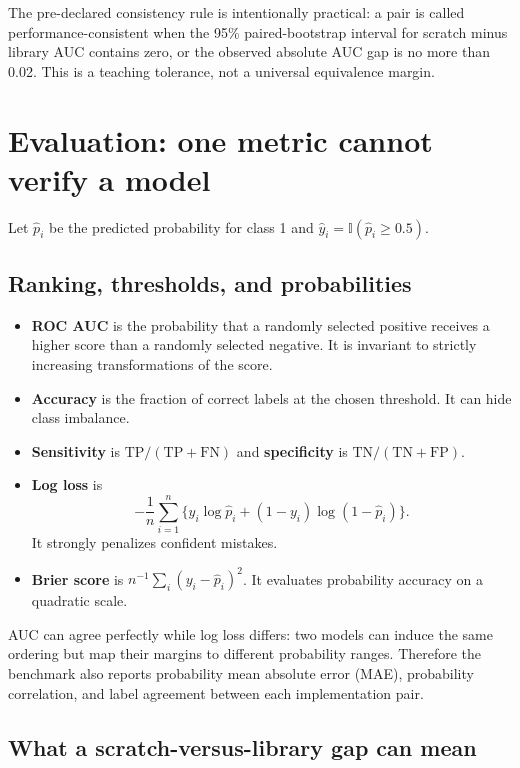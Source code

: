 \documentclass[11pt]{article}
\newcommand{\ind}{\mathbb{1}}
\renewcommand{\ind}{\mathbb{I}}
\begin{document}
The pre-declared consistency rule is intentionally practical: a pair is called
performance-consistent when the 95\% paired-bootstrap interval for scratch minus
library AUC contains zero, or the observed absolute AUC gap is no more than 0.02.
This is a teaching tolerance, not a universal equivalence margin.

\section{Evaluation: one metric cannot verify a model}

Let $\hat p_i$ be the predicted probability for class 1 and
$\hat y_i=\ind(\hat p_i\geq 0.5)$.

\subsection{Ranking, thresholds, and probabilities}

\begin{itemize}
\item \textbf{ROC AUC} is the probability that a randomly selected positive
receives a higher score than a randomly selected negative. It is invariant to
strictly increasing transformations of the score.
\item \textbf{Accuracy} is the fraction of correct labels at the chosen
threshold. It can hide class imbalance.
\item \textbf{Sensitivity} is $\mathrm{TP}/(\mathrm{TP}+\mathrm{FN})$ and
\textbf{specificity} is $\mathrm{TN}/(\mathrm{TN}+\mathrm{FP})$.
\item \textbf{Log loss} is
\[
 -\frac1n\sum_{i=1}^n\{y_i\log\hat p_i+(1-y_i)\log(1-\hat p_i)\}.
\]
It strongly penalizes confident mistakes.
\item \textbf{Brier score} is $n^{-1}\sum_i(y_i-\hat p_i)^2$. It evaluates
probability accuracy on a quadratic scale.
\end{itemize}

AUC can agree perfectly while log loss differs: two models can induce the same
ordering but map their margins to different probability ranges. Therefore the
benchmark also reports probability mean absolute error (MAE), probability
correlation, and label agreement between each implementation pair.

\subsection{What a scratch-versus-library gap can mean}
\end{document}

